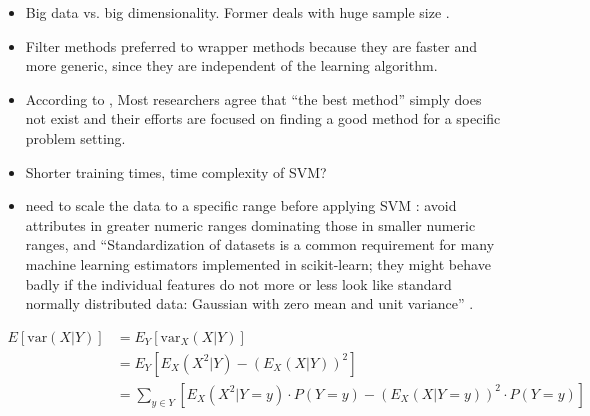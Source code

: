 \documentclass[12pt, twoside, a4paper]{report}
\begin{document}
\begin{itemize}
    \item Big data vs. big dimensionality. Former deals with huge sample size \cite{RefWorks:163}.
    
    \item Filter methods preferred to wrapper methods because they are faster and more generic, since they are independent of the learning algorithm.
    
    \item According to \cite{RefWorks:163}, Most researchers agree that ``the best method'' simply does not exist and their efforts are
focused on finding a good method for a specific problem setting.

    \item Shorter training times, time complexity of SVM?
    
    \item need to scale the data to a specific range before applying SVM \cite{RefWorks:128}: avoid attributes in greater numeric
ranges dominating those in smaller numeric ranges, and ``Standardization of datasets is a common requirement for many machine learning estimators implemented in scikit-learn; they might behave badly if the individual features do not more or less look like standard normally distributed data: Gaussian with zero mean and unit variance'' \cite{scikit-learn}.
    
\end{itemize}

\begin{align*}
E\left[ \text{var} (X|Y) \right]
&= E_Y \left[ \text{var}_X (X|Y) \right] \\
&= E_Y \left[ E_X (X^2|Y) - \left( E_X(X|Y) \right)^2 \right] \\
&= \sum_{y \in Y} \left[ E_X \left( X^2 | Y=y \right) \cdot P(Y=y) - \left( E_X (X|Y=y) \right)^2 \cdot P(Y=y) \right]
\end{align*}





\newpage




\end{document}
